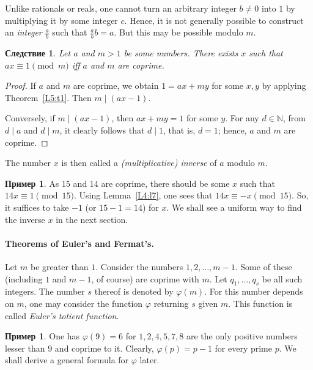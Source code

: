 \documentclass[12pt,notitlepage]{article}
\theoremstyle{plain}
\newtheorem{corr}[thm]{Следствие}
\theoremstyle{definition}
\newtheorem{exm}[thm]{Пример}
\theoremstyle{plain}
\newcommand{\N}{\mathbb{N}}
\renewcommand{\phi}{\varphi}
\newcommand{\1}{\mathbf{1}}
\newcommand{\0}{\mathbf{0}}
\newcommand{\dvd}{\mathop{\mid}}
\begin{document}
Unlike rationals or reals, one cannot turn an arbitrary integer $b \neq 0$ into $1$ by multiplying it by some integer $c$. Hence, it is not generally possible to construct an \emph{integer} $\frac{a}{b}$ such that $\frac{a}{b} b = a$. But this may be possible modulo $m$.
\begin{corr}\label{L5:c2}
	Let $a$ and $m > 1$ be some numbers. There exists $x$ such that $a x \equiv 1 \pmod m$ iff $a$ and $m$ are coprime.
\end{corr}
\begin{proof}
	If $a$ and $m$ are coprime, we obtain $1 = a x + m y$ for some $x, y$ by applying Theorem~\ref{L5:t1}. Then $m \dvd (a x - 1)$.
	
	Conversely, if $m \dvd (a x - 1)$, then $ax + m y = 1$ for some $y$. For any $d \in \N$, from $d \dvd a$ and $d \dvd m$, it clearly follows that $d \dvd 1$, that is, $d = 1$; hence, $a$ and $m$ are coprime.
\end{proof}
\noindent The number $x$ is then called a \emph{(multiplicative) inverse} of $a$ modulo $m$.
\begin{exm}
	As $15$ and $14$ are coprime, there should be some $x$ such that $14 x \equiv 1 \pmod {15}$. Using Lemma~\ref{L4:l7}, one sees that $14 x \equiv -x \pmod {15}$. So, it suffices to take $-1$ (or $15 - 1 = 14$) for $x$. We shall see a uniform way to find the inverse $x$ in the next section.
\end{exm}


\paragraph{Theorems of Euler's and Fermat's.} Let $m$ be greater than $1$. Consider the numbers $1, 2, \ldots, m - 1$. Some of these (including $1$ and $m-1$, of course) are coprime with $m$. Let $q_1, \ldots, q_s$ be all such integers. The number $s$ thereof is denoted by $\phi(m)$. For this number depends on $m$, one may consider the function $\phi$ returning $s$ given $m$. This function is called \emph{Euler's totient function}.

\begin{exm}
	One has $\phi(9) = 6$ for $1, 2, 4, 5, 7, 8$ are the only positive numbers lesser than $9$ and coprime to it. Clearly, $\phi(p) = p - 1$ for every prime $p$. We shall derive a general formula for $\phi$ later.
\end{exm}
\end{document}
